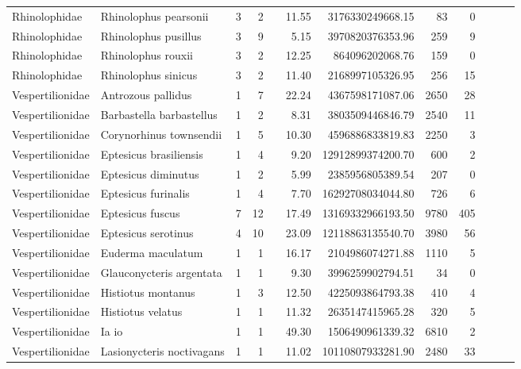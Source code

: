 \begin{landscape}
\begin{longtable}{@{}llrrrrrrrrrr@{}}
  Rhinolophidae & Rhinolophus pearsonii &   3 &   2 &  & 11.55 & 3176330249668.15 &  83 &   0 &  &  &  \\ 
  Rhinolophidae & Rhinolophus pusillus &   3 &   9 &  & 5.15 & 3970820376353.96 & 259 &   9 &  &  &  \\ 
  Rhinolophidae & Rhinolophus rouxii &   3 &   2 &  & 12.25 & 864096202068.76 & 159 &   0 &  &  &  \\ 
  Rhinolophidae & Rhinolophus sinicus &   3 &   2 &  & 11.40 & 2168997105326.95 & 256 &  15 &  &  &  \\ 
  Vespertilionidae & Antrozous pallidus &   1 &   7 &  & 22.24 & 4367598171087.06 & 2650 &  28 &  &  &  \\ 
  Vespertilionidae & Barbastella barbastellus &   1 &   2 &  & 8.31 & 3803509446846.79 & 2540 &  11 &  &  &  \\ 
  Vespertilionidae & Corynorhinus townsendii &   1 &   5 &  & 10.30 & 4596886833819.83 & 2250 &   3 &  &  &  \\ 
  Vespertilionidae & Eptesicus brasiliensis &   1 &   4 &  & 9.20 & 12912899374200.70 & 600 &   2 &  &  &  \\ 
  Vespertilionidae & Eptesicus diminutus &   1 &   2 &  & 5.99 & 2385956805389.54 & 207 &   0 &  &  &  \\ 
  Vespertilionidae & Eptesicus furinalis &   1 &   4 &  & 7.70 & 16292708034044.80 & 726 &   6 &  &  &  \\ 
  Vespertilionidae & Eptesicus fuscus &   7 &  12 &  & 17.49 & 13169332966193.50 & 9780 & 405 &  &  &  \\ 
  Vespertilionidae & Eptesicus serotinus &   4 &  10 &  & 23.09 & 12118863135540.70 & 3980 &  56 &  &  &  \\ 
  Vespertilionidae & Euderma maculatum &   1 &   1 &  & 16.17 & 2104986074271.88 & 1110 &   5 &  &  &  \\ 
  Vespertilionidae & Glauconycteris argentata &   1 &   1 &  & 9.30 & 3996259902794.51 &  34 &   0 &  &  &  \\ 
  Vespertilionidae & Histiotus montanus &   1 &   3 &  & 12.50 & 4225093864793.38 & 410 &   4 &  &  &  \\ 
  Vespertilionidae & Histiotus velatus &   1 &   1 &  & 11.32 & 2635147415965.28 & 320 &   5 &  &  &  \\ 
  Vespertilionidae & Ia io &   1 &   1 &  & 49.30 & 1506490961339.32 & 6810 &   2 &  &  &  \\ 
  Vespertilionidae & Lasionycteris noctivagans &   1 &   1 &  & 11.02 & 10110807933281.90 & 2480 &  33 &  &  &  \\ 

\end{longtable}
\end{landscape}
